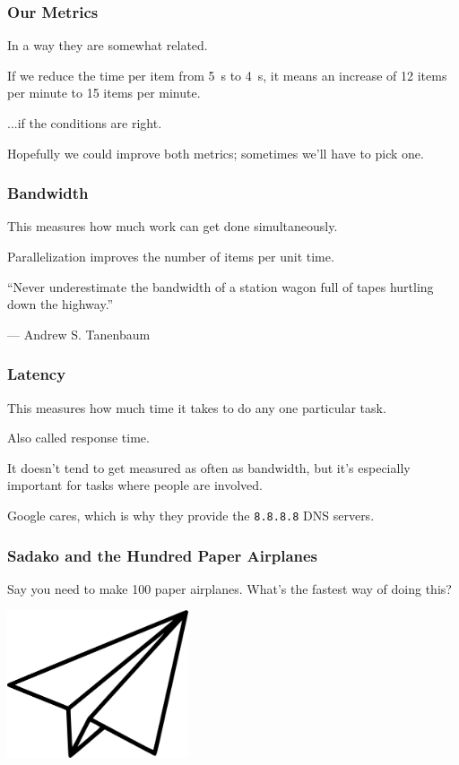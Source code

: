 \begin{frame}
\frametitle{Our Metrics}

In a way they are somewhat related. 

If we reduce the time per item from 5~s to 4~s, it means an increase of 12 items per minute to 15 items per minute.

...if the conditions are right. 

Hopefully we could improve both metrics; sometimes we'll have to pick one.



\end{frame}

\begin{frame}
\frametitle{Bandwidth}

This measures how much work can get 
done simultaneously.

Parallelization improves the number
of items per unit time. 

``Never underestimate the bandwidth of a station wagon full of tapes hurtling down the highway.''

\hfill --- Andrew S. Tanenbaum

\end{frame}




\begin{frame}
\frametitle{Latency}

This measures how much time it takes to do
any one particular task.

Also called response time.

It doesn't tend to get measured as often as bandwidth, but it's especially
important for tasks where people are involved. 

Google cares, which is why they provide the {\tt 8.8.8.8} DNS servers.



\end{frame}


\begin{frame}
\frametitle{Sadako and the Hundred Paper Airplanes}

 Say you need to make
100 paper airplanes. What's the fastest way of doing this?

\begin{center}
\includegraphics[width=0.4\textwidth]{images/paper-airplane.png}
\end{center}

\end{frame}



